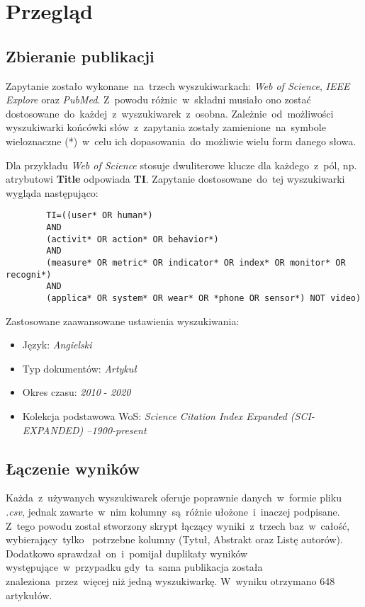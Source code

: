 \section{Przegląd}

\subsection{Zbieranie publikacji}
Zapytanie zostało wykonane~na~trzech wyszukiwarkach: \textit{Web of Science}, \textit{IEEE Explore} oraz \textit{PubMed}. Z~powodu różnic~w~składni musiało ono zostać dostosowane~do~każdej~z~wyszukiwarek~z~osobna. Zależnie~od~możliwości wyszukiwarki końcówki słów~z~zapytania zostały zamienione~na~symbole wieloznaczne (*)~w~celu ich dopasowania~do~możliwie wielu form danego słowa.

Dla przykładu \textit{Web of Science} stosuje dwuliterowe klucze dla każdego~z~pól, np. atrybutowi {\bf Title} odpowiada {\bf TI}. Zapytanie dostosowane~do~tej wyszukiwarki wygląda następująco:
\begin{center}
	\begin{minipage}{0.85\linewidth}
		\begin{verbatim}
		TI=((user* OR human*) 
		AND 
		(activit* OR action* OR behavior*)
		AND 
		(measure* OR metric* OR indicator* OR index* OR monitor* OR recogni*) 
		AND 
		(applica* OR system* OR wear* OR *phone OR sensor*) NOT video)
		\end{verbatim}
	\end{minipage}
\end{center}
Zastosowane zaawansowane ustawienia wyszukiwania:
\begin{itemize}
    \item Język: {\it Angielski}
    \item Typ dokumentów: {\it Artykuł}
    \item Okres czasu: {\it 2010} - {\it 2020}
    \item Kolekcja podstawowa WoS: {\it Science Citation Index Expanded (SCI-EXPANDED) --1900-present}
\end{itemize}

\subsection{Łączenie wyników}
Każda~z~używanych wyszukiwarek oferuje poprawnie danych~w~formie pliku {\it .csv}, jednak zawarte~w~nim kolumny~są~różnie ułożone~i~inaczej podpisane. Z~tego powodu został stworzony skrypt łączący wyniki~z~trzech baz~w~całość, wybierający~tylko~ potrzebne kolumny (Tytuł, Abstrakt oraz Listę autorów). Dodatkowo sprawdzał~on~i~pomijał duplikaty wyników występujące~w~przypadku gdy~ta~sama publikacja została znaleziona~przez~więcej niż jedną wyszukiwarkę. W~wyniku otrzymano 648 artykułów.

